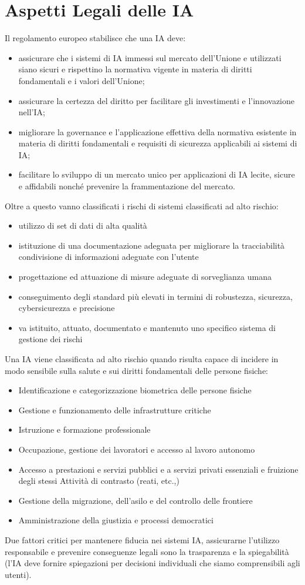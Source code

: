 \section{Aspetti Legali delle IA}
Il regolamento europeo stabilisce che una IA deve:
\begin{itemize}
    \item assicurare che i sistemi di IA immessi sul mercato dell’Unione e utilizzati siano sicuri e rispettino la normativa vigente in materia di diritti fondamentali e i valori dell’Unione; 
    \item assicurare la certezza del diritto per facilitare gli investimenti e l’innovazione nell’IA; 
    \item migliorare la governance e l’applicazione effettiva della normativa esistente in materia di diritti fondamentali e requisiti di sicurezza applicabili ai sistemi di IA; 
    \item facilitare lo sviluppo di un mercato unico per applicazioni di IA lecite, sicure e affidabili nonché prevenire la frammentazione del mercato.
\end{itemize}

Oltre a questo vanno classificati i rischi di sistemi classificati ad alto rischio:
\begin{itemize}
    \item utilizzo di set di dati di alta qualità 
    \item istituzione di una documentazione adeguata per migliorare la tracciabilità condivisione di informazioni adeguate con l’utente 
    \item progettazione ed attuazione di misure adeguate di sorveglianza umana 
    \item conseguimento degli standard più elevati in termini di robustezza, sicurezza, cybersicurezza e precisione 
    \item va istituito, attuato, documentato e mantenuto uno specifico sistema di gestione dei rischi
\end{itemize}

Una IA viene classificata ad alto rischio quando risulta capace di incidere in modo sensibile sulla salute e sui diritti fondamentali delle persone fisiche:
\begin{itemize}
    \item Identificazione e categorizzazione biometrica delle persone fisiche
    \item Gestione e funzionamento delle infrastrutture critiche 
    \item Istruzione e formazione professionale 
    \item Occupazione, gestione dei lavoratori e accesso al lavoro autonomo
    \item Accesso a prestazioni e servizi pubblici e a servizi privati essenziali e fruizione degli stessi Attività di contrasto (reati, etc.,)
    \item Gestione della migrazione, dell'asilo e del controllo delle frontiere
    \item Amministrazione della giustizia e processi democratici
\end{itemize}

Due fattori critici per mantenere fiducia nei sistemi IA, assicurarne l'utilizzo responsabile e prevenire conseguenze legali sono la trasparenza e la spiegabilità (l'IA deve fornire spiegazioni per decisioni individuali che siamo comprensibili agli utenti).

